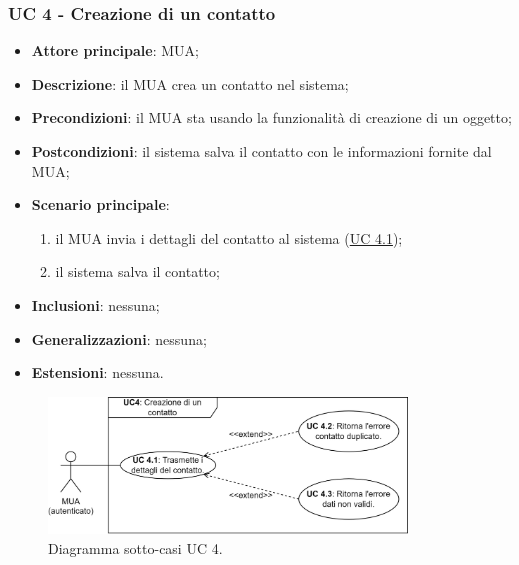 \subsubsection{UC 4 - Creazione di un contatto} \label{sec:UC4}
    \begin{itemize}
        \item \textbf{Attore principale}: MUA;
        \item \textbf{Descrizione}: il MUA crea un contatto nel sistema;
        \item \textbf{Precondizioni}: il MUA sta usando la funzionalità di creazione di un oggetto;
        \item \textbf{Postcondizioni}: il sistema salva il contatto con le informazioni fornite dal MUA;
        \item \textbf{Scenario principale}:
            \begin{enumerate}
                \item il MUA invia i dettagli del contatto al sistema (\hyperref[sec:UC4.1]{UC 4.1});
                \item il sistema salva il contatto;
            \end{enumerate}
        \item \textbf{Inclusioni}: nessuna;
        \item \textbf{Generalizzazioni}: nessuna;
        \item \textbf{Estensioni}: nessuna.
    \end{itemize}

\begin{figure}[h]
    \includegraphics[width=0.85\textwidth]{sections/uc_imgs/UC04.X.png}
    \centering
    \caption{Diagramma sotto-casi UC 4.}
\end{figure}

